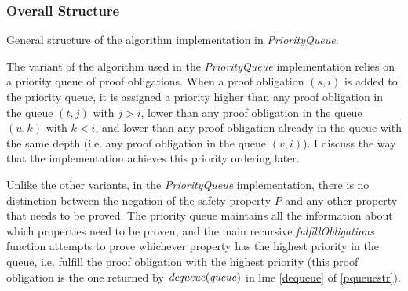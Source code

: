 \documentclass[12pt,a4paper,twoside,openright]{report}
\begin{document}
{\subsubsection{Overall Structure}
\begin{algorithm}[!Ht]
\DontPrintSemicolon
{}
\Fn{fulfillObligations$(M,[F_0,\ldots,F_k],{\it queue}])$}{
  \Let{$((s,i), {\it q}) = {\it dequeue(queue)}$ \label{dequeue}}{
  \lIf{$F_{i - 1} \wedge T \Rightarrow \neg s'$}{\Return{${\it pushFrame(M, [F_0, \dots, F_k], q, (s,i))}$} \label{pqueuestr:pushFrame}}
  }
  \lElse{\Let{${\it cti = nextCTI(F_{i - 1} \wedge T \Rightarrow \neg s')}$}{
      \If{$I \Rightarrow \neg {\it cti}$}{
        \Let{${\it (fixed, [G_0, \ldots, G_k], d) = propagate([F_0 \cup \{\neg cti\}, F_1, \ldots, F_k], {\it \neg cti})}$ \label{pqueuestr:propagate}}{
          \lIf{\it fixed}{\Return{True}}
          \Return{${\it fulfillObligation(M, [G_0 , \ldots, G_k], (generalize(\neg cti, d),d))}$}
        }
      }
      \lElse{\Return{False}}}}
}
\caption{General structure of the algorithm implementation in {\it PriorityQueue}.}
\label{pqueuestr}
\end{algorithm}

The variant of the algorithm used in the {\it PriorityQueue} implementation
relies on a priority queue of proof obligations.
When a proof obligation $(s,i)$ is added to the priority queue,
it is assigned a priority higher than any proof obligation in the queue $(t,j)$ with $j > i$,
lower than any proof obligation in the queue $(u,k)$ with $k < i$, and lower
than any proof obligation already in the queue with the same depth (i.e. any
proof obligation in the queue $(v, i)$). I discuss the
way that the implementation achieves this priority ordering later.

Unlike the other variants, in the {\it PriorityQueue} implementation, there is
no distinction between the negation of the safety property $P$ and any other property that needs
to be proved. The priority queue maintains all the information about which properties need to be proven,
and the main recursive {\it fulfillObligations} function attempts to prove whichever property has the highest priority in the queue, i.e. fulfill the proof obligation with the highest priority (this proof obligation
is the one returned by ${\it dequeue(queue)}$ in line \ref{dequeue} of \ref{pqueuestr}).

}
\end{document}
